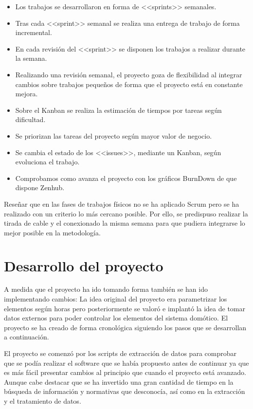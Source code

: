 \begin{itemize}
    \item Los trabajos se desarrollaron en forma de <<sprints>> semanales.
    \item Tras cada <<sprint>> semanal se realiza una entrega de trabajo de forma incremental.
    \item En cada revisión del <<sprint>> se disponen los trabajos a realizar durante la semana.
    \item Realizando una revisión semanal, el proyecto goza de flexibilidad al integrar cambios sobre trabajos pequeños de forma que el proyecto está en constante mejora.
    \item Sobre el Kanban se realiza la estimación de tiempos por tareas según dificultad.
    \item Se priorizan las tareas del proyecto según mayor valor de negocio.
    \item Se cambia el estado de los <<issues>>, mediante un Kanban, según evoluciona el trabajo.
    \item Comprobamos como avanza el proyecto con los gráficos BurnDown de que dispone Zenhub.
\end{itemize}

Reseñar que en las fases de trabajos físicos no se ha aplicado Scrum pero se ha realizado con un criterio lo más cercano posible. Por ello, se predispuso realizar la tirada de cable y el conexionado la misma semana para que pudiera integrarse lo mejor posible en la metodología.

\section{Desarrollo del proyecto}
A medida que el proyecto ha ido tomando forma también se han ido implementando cambios: La idea original del proyecto era parametrizar los elementos según horas pero posteriormente se valoró e implantó la idea de tomar datos externos para poder controlar los elementos del sistema domótico. El proyecto se ha creado de forma cronológica siguiendo los pasos que se desarrollan a continuación.

El proyecto se comenzó por los scripts de extracción de datos para comprobar que se podía realizar el software que se había propuesto antes de continuar ya que es más fácil presentar cambios al principio que cuando el proyecto está avanzado. Aunque cabe destacar que se ha invertido una gran cantidad de tiempo en la búsqueda de información y normativas que desconocía, así como en la extracción y el tratamiento de datos.

